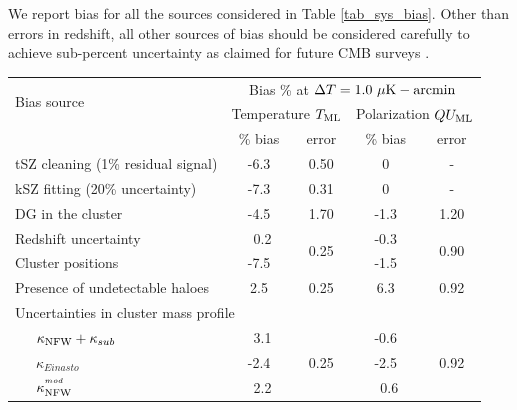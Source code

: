    We report bias for all the sources considered in Table \ref{tab_sys_bias}. 
 Other than errors in redshift, all other sources of bias should be considered carefully to achieve sub-percent uncertainty as claimed for future CMB surveys \citep{cmbs4-sb1}. 
 \begin {table}[ht]
\centering
\begin{tabular}{| l | c  | c | c | c |}
    \hline
    \multirow{2}{*}{Bias source} & \multicolumn{4}{c|}{Bias \% at $\Delta T = 1.0\ \mu{\rm K-arcmin}$}\\
    \cline{2-5}
    & \multicolumn{2}{c|}{Temperature $T_{\rm ML}$} & \multicolumn{2}{c|}{Polarization $QU_{\rm ML}$} \\%
    \cline{2-5}
     & \% bias& error & \% bias & error \\\hline
    tSZ cleaning (1\% residual signal) & -6.3 & 0.50 & 0 & - \\\hline
    kSZ fitting (20\% uncertainty) & -7.3  & 0.31 & 0 & - \\\hline

    DG in the cluster & -4.5 & 1.70 & -1.3 & 1.20\\\hline
    \hline
    Redshift uncertainty & {\ }0.2 & \multirow{2}{*}{0.25} & -0.3 & \multirow{2}{*}{0.90} \\%
    \cline{1-2}\cline{4-4}
    Cluster positions & -7.5 & & -1.5 & \\\hline
    \hline
   Presence of undetectable haloes & 2.5 & 0.25  &6.3 &0.92\\
    \hline\hline
    \multicolumn{5}{|l|}{Uncertainties in cluster mass profile}\\\hline
   ~~~$\kappa_{\rm NFW} + \kappa_{sub}$ & {\ }3.1 & \multirow{4}{*}{0.25} & -0.6 & \multirow{4}{*}{0.92}\\%
    \cline{1-2}\cline{4-4}
    ~~~$\kappa_{Einasto}$ & -2.4 & & -2.5 &\\%
    \cline{1-2}\cline{4-4}
    ~~~$\kappa_{\rm NFW}^{^{mod}}$ & {\ }2.2  & & {\ }0.6 & \\\hline


\end{tabular}
\end{table}
